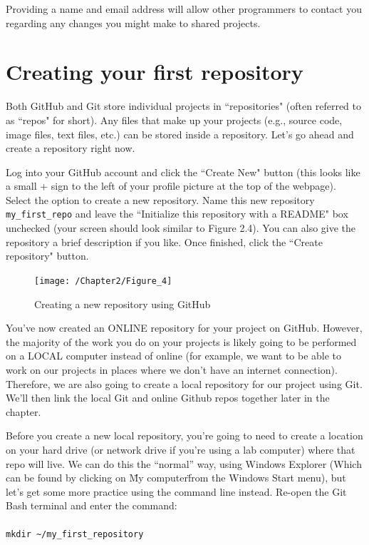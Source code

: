 \documentclass{book}
\begin{document}
Providing a name and email address will allow other programmers to contact you regarding any changes you might make to shared projects.

\section{Creating your first repository}

Both GitHub and Git store individual projects in ``repositories" (often referred to as ``repos" for short). Any files that make up your projects (e.g., source code, image files, text files, etc.) can be stored inside a repository. Let's go ahead and create a repository right now. 

Log into your GitHub account and click the ``Create New" button (this looks like a small + sign to the left of your profile picture at the top of the webpage). Select the option to create a new repository. Name this new repository \texttt{my\_first\_repo} and leave the ``Initialize this repository with a README" box unchecked (your screen should look similar to Figure 2.4). You can also give the repository a brief description if you like. Once finished, click the ``Create repository" button. 

\begin{figure}[h]
	\caption{Creating a new repository using GitHub}
	\centering\texttt{[image: /Chapter2/Figure\_4]}
\end{figure}

You've now created an ONLINE repository for your project on GitHub. However, the majority of the work you do on your projects is likely going to be performed on a LOCAL computer instead of online (for example, we want to be able to work on our projects in places where we don't have an internet connection). Therefore, we are also going to create a local repository for our project using Git. We'll then link the local Git and online Github repos together later in the chapter.

Before you create a new local repository, you're going to need to create a location on your hard drive (or network drive if you're using a lab computer) where that repo will live. We can do this the ``normal'' way, using Windows Explorer (Which can be found by clicking on \"My computer\" from the Windows Start menu), but let's get some more practice using the command line instead.  Re-open the Git Bash terminal and enter the command: \\ \\ \texttt{mkdir \textasciitilde/my\_first\_repository}
 
\end{document}
